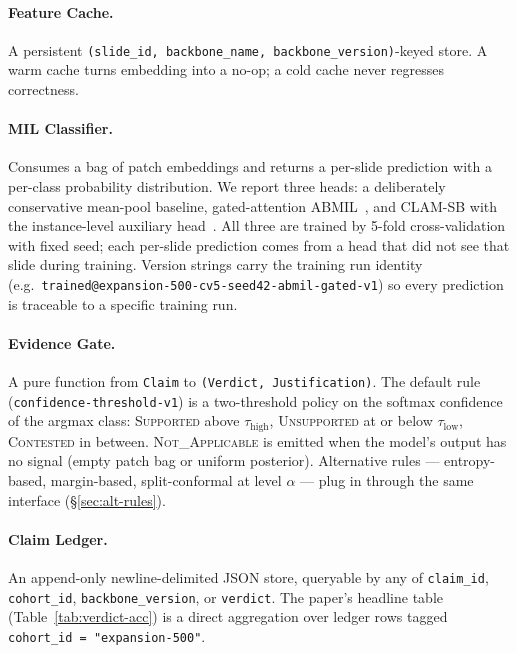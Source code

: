 \documentclass{article}
\begin{document}
\paragraph{Feature Cache.} A persistent \texttt{(slide\_id, backbone\_name, backbone\_version)}-keyed store. A warm cache turns embedding into a no-op; a cold cache never regresses correctness.

\paragraph{MIL Classifier.} Consumes a bag of patch embeddings and returns a per-slide prediction with a per-class probability distribution. We report three heads: a deliberately conservative mean-pool baseline, gated-attention ABMIL~\citep{ilse2018attention}, and CLAM-SB with the instance-level auxiliary head~\citep{lu2021clam}. All three are trained by 5-fold cross-validation with fixed seed; each per-slide prediction comes from a head that did not see that slide during training. Version strings carry the training run identity (e.g.\ \texttt{trained@expansion-500-cv5-seed42-abmil-gated-v1}) so every prediction is traceable to a specific training run.

\paragraph{Evidence Gate.} A pure function from \texttt{Claim} to \texttt{(Verdict, Justification)}. The default rule (\texttt{confidence-threshold-v1}) is a two-threshold policy on the softmax confidence of the argmax class: \textsc{Supported} above $\tau_{\text{high}}$, \textsc{Unsupported} at or below $\tau_{\text{low}}$, \textsc{Contested} in between. \textsc{Not\_Applicable} is emitted when the model's output has no signal (empty patch bag or uniform posterior). Alternative rules --- entropy-based, margin-based, split-conformal at level $\alpha$ --- plug in through the same interface (\S\ref{sec:alt-rules}).

\paragraph{Claim Ledger.} An append-only newline-delimited JSON store, queryable by any of \texttt{claim\_id}, \texttt{cohort\_id}, \texttt{backbone\_version}, or \texttt{verdict}. The paper's headline table (Table~\ref{tab:verdict-acc}) is a direct aggregation over ledger rows tagged \texttt{cohort\_id = "expansion-500"}.
\end{document}
